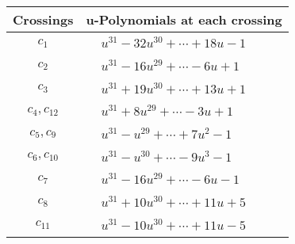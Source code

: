 \documentclass[1p]{elsarticle_modified}
\theoremstyle{definition}
\begin{document}
\begin{tabular}{m{50pt}|m{274pt}}
Crossings & \hspace{64pt}u-Polynomials at each crossing \\
\hline $$\begin{aligned}c_{1}\end{aligned}$$&$\begin{aligned}
&u^{31}-32 u^{30}+\cdots+18 u-1
\end{aligned}$\\
\hline $$\begin{aligned}c_{2}\end{aligned}$$&$\begin{aligned}
&u^{31}-16 u^{29}+\cdots-6 u+1
\end{aligned}$\\
\hline $$\begin{aligned}c_{3}\end{aligned}$$&$\begin{aligned}
&u^{31}+19 u^{30}+\cdots+13 u+1
\end{aligned}$\\
\hline $$\begin{aligned}c_{4},c_{12}\end{aligned}$$&$\begin{aligned}
&u^{31}+8 u^{29}+\cdots-3 u+1
\end{aligned}$\\
\hline $$\begin{aligned}c_{5},c_{9}\end{aligned}$$&$\begin{aligned}
&u^{31}- u^{29}+\cdots+7 u^2-1
\end{aligned}$\\
\hline $$\begin{aligned}c_{6},c_{10}\end{aligned}$$&$\begin{aligned}
&u^{31}- u^{30}+\cdots-9 u^3-1
\end{aligned}$\\
\hline $$\begin{aligned}c_{7}\end{aligned}$$&$\begin{aligned}
&u^{31}-16 u^{29}+\cdots-6 u-1
\end{aligned}$\\
\hline $$\begin{aligned}c_{8}\end{aligned}$$&$\begin{aligned}
&u^{31}+10 u^{30}+\cdots+11 u+5
\end{aligned}$\\
\hline $$\begin{aligned}c_{11}\end{aligned}$$&$\begin{aligned}
&u^{31}-10 u^{30}+\cdots+11 u-5
\end{aligned}$\\
\hline
\end{tabular}\\~\\
\end{document}

